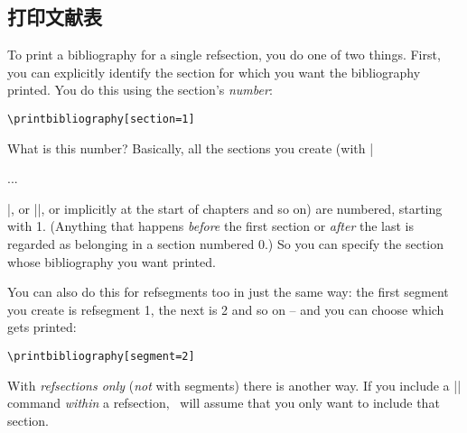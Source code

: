 \subsection{打印文献表}

To print a bibliography for a single refsection, you do one of two
things. First, you can explicitly identify the section for which you
want the bibliography printed. You do this using the section's
\emph{number}:

\begin{Verbatim}
\printbibliography[section=1]
\end{Verbatim}

What is this number? Basically, all the sections you create (with
|\begin{refsection}...\end{refsection}|, or |\newrefsection|, or
implicitly at the start of chapters and so on) are numbered, starting
with 1. (Anything that happens \emph{before} the first section or
\emph{after} the last is regarded as belonging in a section numbered
0.) So you can specify the section whose bibliography you want
printed.

You can also do this for refsegments too in just the same way: the
first segment you create is refsegment 1, the next is 2 and so on --
and you can choose which gets printed:

\begin{Verbatim}
\printbibliography[segment=2]
\end{Verbatim}

With \emph{refsections only} (\emph{not} with segments) there is
another way. If you include a |\printbibliography| command
\emph{within} a refsection, \biblatex\ will assume that you only want
to include that section.

